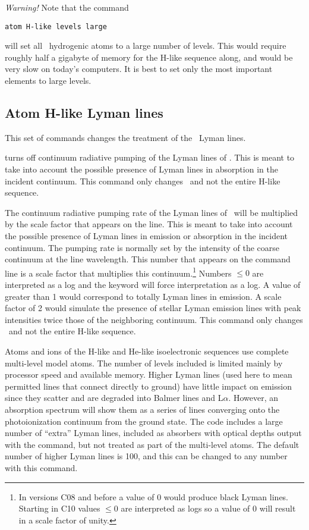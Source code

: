 \emph{Warning!}  Note that the command
\begin{verbatim}
atom H-like levels large
\end{verbatim}
will set all \LIMELM\ hydrogenic atoms to a large number of levels.
This would
require roughly half a gigabyte of memory for the H-like sequence along,
and would be very slow on today's computers.
It is best to set only the
most important elements to large levels.

\subsection{Atom H-like Lyman lines}

This set of commands changes the treatment of the \hi\ Lyman lines.

  turns off
continuum radiative pumping of the Lyman lines of \hi.
This is meant to take into account the possible
presence of Lyman lines in absorption in the incident continuum.
This
command only changes \hi\ and not the entire H-like sequence.

The continuum radiative pumping rate
of the Lyman lines of \hi\ will be multiplied by the scale factor
that appears on the line.
This is meant to take into account the possible presence of
Lyman lines in emission or absorption in the incident continuum.
The pumping
rate is normally set by the intensity of the coarse continuum at the line
wavelength.
This number that appears on the command line is a scale factor
that multiplies this continuum.\footnote{In versions C08 and before a value of 0 would produce black Lyman lines.
Starting in C10 values $\le 0$ are interpreted as logs
so a value of 0 will result in a scale factor of unity.}
Numbers $\le 0$ are interpreted as a log and
the  keyword will force interpretation as a log.
A value of greater than 1 would correspond to totally Lyman lines
in emission.
A scale factor of
2 would simulate the presence of stellar Lyman emission lines with peak
intensities twice those of the neighboring continuum.
This command only
changes \hi\ and not the entire H-like sequence.

  Atoms and ions of the
H-like and He-like
isoelectronic sequences use complete multi-level model atoms.
The number
of levels included is limited mainly by processor speed and
available memory.
Higher Lyman lines (used here to mean permitted lines
that connect directly
to ground) have little impact on emission since they
scatter and are degraded
into Balmer lines and L$\alpha $.
However, an absorption spectrum will show them
as a series of lines converging onto the photoionization continuum from
the ground state.
The code includes a large number of ``extra'' Lyman lines,
included as absorbers with optical depths output with
the  command,
but not treated as part of the multi-level atoms.
The default number of higher Lyman lines is 100, and
this can be changed to any number with this command.

